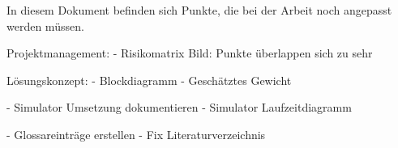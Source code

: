 
In diesem Dokument befinden sich Punkte, die bei der Arbeit noch angepasst werden müssen.

Projektmanagement:
- Risikomatrix Bild: Punkte überlappen sich zu sehr

Lösungskonzept:
- Blockdiagramm
- Geschätztes Gewicht

- Simulator Umsetzung dokumentieren
- Simulator Laufzeitdiagramm


- Glossareinträge erstellen
- Fix Literaturverzeichnis